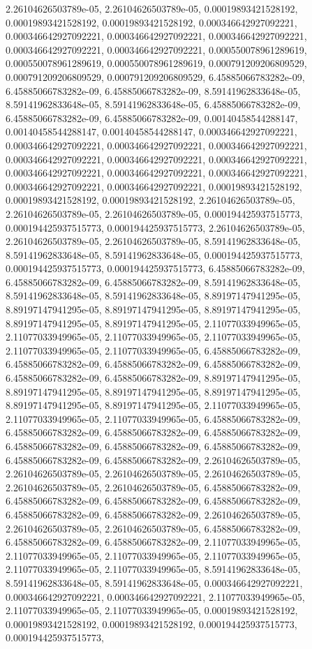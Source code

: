 \documentclass[
  ,man]{apa6}
\begin{document}
2.26104626503789e-05, 2.26104626503789e-05, 0.00019893421528192, 0.00019893421528192, 0.00019893421528192, 0.000346642927092221, 0.000346642927092221, 0.000346642927092221, 0.000346642927092221, 0.000346642927092221, 0.000346642927092221, 0.000550078961289619, 0.000550078961289619, 0.000550078961289619, 0.000791209206809529, 0.000791209206809529, 0.000791209206809529, 6.45885066783282e-09, 6.45885066783282e-09, 6.45885066783282e-09, 8.59141962833648e-05, 8.59141962833648e-05, 8.59141962833648e-05,
6.45885066783282e-09, 6.45885066783282e-09, 6.45885066783282e-09, 0.00140458544288147, 0.00140458544288147, 0.00140458544288147, 0.000346642927092221, 0.000346642927092221, 0.000346642927092221, 0.000346642927092221, 0.000346642927092221, 0.000346642927092221, 0.000346642927092221, 0.000346642927092221, 0.000346642927092221, 0.000346642927092221, 0.000346642927092221, 0.000346642927092221, 0.00019893421528192, 0.00019893421528192, 0.00019893421528192, 2.26104626503789e-05, 2.26104626503789e-05, 2.26104626503789e-05,
0.000194425937515773, 0.000194425937515773, 0.000194425937515773, 2.26104626503789e-05, 2.26104626503789e-05, 2.26104626503789e-05, 8.59141962833648e-05, 8.59141962833648e-05, 8.59141962833648e-05, 0.000194425937515773, 0.000194425937515773, 0.000194425937515773, 6.45885066783282e-09, 6.45885066783282e-09, 6.45885066783282e-09, 8.59141962833648e-05, 8.59141962833648e-05, 8.59141962833648e-05, 8.89197147941295e-05, 8.89197147941295e-05, 8.89197147941295e-05, 8.89197147941295e-05, 8.89197147941295e-05,
8.89197147941295e-05, 2.11077033949965e-05, 2.11077033949965e-05, 2.11077033949965e-05, 2.11077033949965e-05, 2.11077033949965e-05, 2.11077033949965e-05, 6.45885066783282e-09, 6.45885066783282e-09, 6.45885066783282e-09, 6.45885066783282e-09, 6.45885066783282e-09, 6.45885066783282e-09, 8.89197147941295e-05, 8.89197147941295e-05, 8.89197147941295e-05, 8.89197147941295e-05, 8.89197147941295e-05, 8.89197147941295e-05, 2.11077033949965e-05, 2.11077033949965e-05, 2.11077033949965e-05, 6.45885066783282e-09,
6.45885066783282e-09, 6.45885066783282e-09, 6.45885066783282e-09, 6.45885066783282e-09, 6.45885066783282e-09, 6.45885066783282e-09, 6.45885066783282e-09, 6.45885066783282e-09, 2.26104626503789e-05, 2.26104626503789e-05, 2.26104626503789e-05, 2.26104626503789e-05, 2.26104626503789e-05, 2.26104626503789e-05, 6.45885066783282e-09, 6.45885066783282e-09, 6.45885066783282e-09, 6.45885066783282e-09, 6.45885066783282e-09, 6.45885066783282e-09, 2.26104626503789e-05, 2.26104626503789e-05, 2.26104626503789e-05,
6.45885066783282e-09, 6.45885066783282e-09, 6.45885066783282e-09, 2.11077033949965e-05, 2.11077033949965e-05, 2.11077033949965e-05, 2.11077033949965e-05, 2.11077033949965e-05, 2.11077033949965e-05, 8.59141962833648e-05, 8.59141962833648e-05, 8.59141962833648e-05, 0.000346642927092221, 0.000346642927092221, 0.000346642927092221, 2.11077033949965e-05, 2.11077033949965e-05, 2.11077033949965e-05, 0.00019893421528192, 0.00019893421528192, 0.00019893421528192, 0.000194425937515773, 0.000194425937515773,
\end{document}
